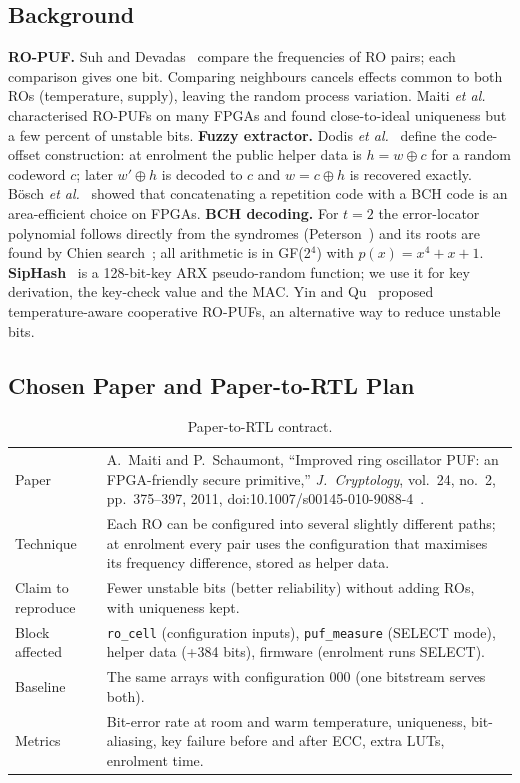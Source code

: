 \documentclass[11pt,a4paper]{article}
\begin{document}
\subsection{Background}
\textbf{RO-PUF.} Suh and Devadas~\cite{suh07} compare the frequencies of RO pairs; each comparison gives
one bit. Comparing neighbours cancels effects common to both ROs (temperature, supply), leaving the
random process variation. Maiti \emph{et al.}~\cite{maiti10} characterised RO-PUFs on many FPGAs and
found close-to-ideal uniqueness but a few percent of unstable bits. \textbf{Fuzzy extractor.} Dodis
\emph{et al.}~\cite{dodis04} define the code-offset construction: at enrolment the public helper data
is $h = w \oplus c$ for a random codeword $c$; later $w' \oplus h$ is decoded to $c$ and $w = c\oplus h$
is recovered exactly. B\"osch \emph{et al.}~\cite{bosch08} showed that concatenating a repetition code
with a BCH code is an area-efficient choice on FPGAs. \textbf{BCH decoding.} For $t=2$ the error-locator
polynomial follows directly from the syndromes (Peterson~\cite{peterson60}) and its roots are found by
Chien search~\cite{chien64}; all arithmetic is in GF(2$^4$) with $p(x)=x^4+x+1$. \textbf{SipHash}~\cite{siphash}
is a 128-bit-key ARX pseudo-random function; we use it for key derivation, the key-check value and the
MAC. Yin and Qu~\cite{yin09} proposed temperature-aware cooperative RO-PUFs, an alternative way to reduce
unstable bits.

\subsection{Chosen Paper and Paper-to-RTL Plan}
\begin{table}[H]\centering\small
\caption{Paper-to-RTL contract.}\label{tab:contract}
\begin{tabularx}{\linewidth}{@{}lX@{}}
\toprule
Paper & A.~Maiti and P.~Schaumont, ``Improved ring oscillator PUF: an FPGA-friendly secure primitive,''
\emph{J.\ Cryptology}, vol.~24, no.~2, pp.~375--397, 2011, doi:10.1007/s00145-010-9088-4~\cite{maiti11}.\\
Technique & Each RO can be configured into several slightly different paths; at enrolment every pair
uses the configuration that maximises its frequency difference, stored as helper data.\\
Claim to reproduce & Fewer unstable bits (better reliability) without adding ROs, with uniqueness kept.\\
Block affected & \texttt{ro\_cell} (configuration inputs), \texttt{puf\_measure} (SELECT mode), helper data
(+384 bits), firmware (enrolment runs SELECT).\\
Baseline & The same arrays with configuration 000 (one bitstream serves both).\\
Metrics & Bit-error rate at room and warm temperature, uniqueness, bit-aliasing, key failure before and
after ECC, extra LUTs, enrolment time.\\
\bottomrule
\end{tabularx}
\end{table}
\end{document}
